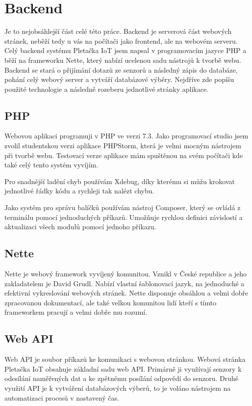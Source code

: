 \section{Backend}
Je to nejobsáhlejší část celé této práce. 
Backend je serverová část webových stránek, neběží tedy u vás na počítači jako frontend, ale na webovém serveru.   
Celý backend systému Pletačka IoT jsem napsal v programovacím jazyce PHP a běží na frameworku Nette\cite{NETTE}, který nabízí ucelenou sadu nástrojů k tvorbě webu.
Backend se stará o přijímání dotazů ze senzorů a následný zápis do databáze, pohání celý webový server a vytváří databázové výběry.
Nejdříve zde popíšu použité technologie a následně rozeberu jednotlivé stránky aplikace.

\subsection{PHP}
Webovou aplikaci programuji v PHP ve verzi 7.3. Jako programovací studio jsem zvolil studentskou verzi aplikace PHPStorm, která je velmi mocným nástrojem při tvorbě webu.
Testovací verze aplikace mám spuštěnou na svém počítači kde také celý tento systém vyvíjím. 

Pro snadnější ladění chyb používám Xdebug, díky kterému si můžu krokovat jednotlivé řádky kódu a rychleji tak nalézt chybu.

Jako systém pro správu balíčků používám nástroj Composer, který se ovládá z terminálu pomocí jednoduchých příkazů.
Umožňuje rychlou definici závislostí a aktualizaci všech modulů pomocí jednoho příkazu.


\subsection{Nette}
Nette je webový framework vyvíjený komunitou. Vznikl v České republice a jeho zakladatelem je David Grudl. 
Nabízí vlastní šablonovací jazyk, na jednoduché a efektivní vykreslování webových stránek. 
Nette disponuje obsáhlou a velmi dobře zpracovanou dokumentací, ale také velkou komunitou lidí kteří s tímto frameworkem pracují a velmi dobře mu rozumí. 


\subsection{Web API}
Web API je soubor příkazů ke komunikaci s webovou stránkou.
Webová stránka Pletačka IoT obsahuje základní sadu web API.
Primárně ji využívají senzory k odesílání naměřených dat a ke zpětnému posílání odpovědí do senzoru.
Druhé využití API je k vytváření databázových výberů, to je voláno nástrojem na automatizaci procesů v nastavený čas. 


